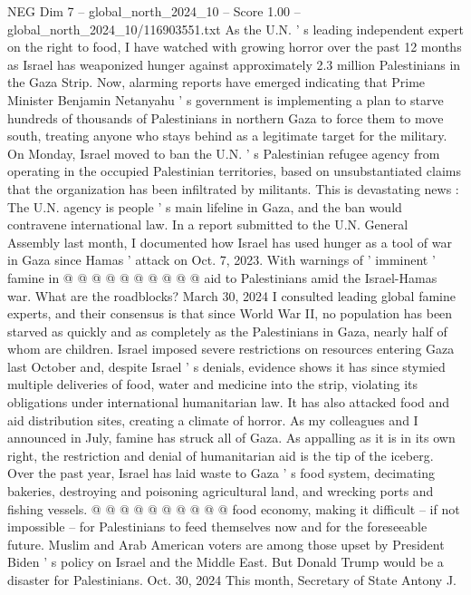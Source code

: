 \begin{textsample}{NEG Dim 7 – global\_north\_2024\_10 – Score 1.00 – global\_north\_2024\_10/116903551.txt}  \label{ex:f7_neg_365}
As the U.N. ' s leading independent expert on the right to food, I have watched with growing horror over the past 12 months as Israel has weaponized hunger against approximately 2.3 million Palestinians in the Gaza Strip.
Now, alarming reports have emerged indicating that Prime Minister Benjamin Netanyahu ' s government is implementing a plan to starve hundreds of thousands of Palestinians in northern Gaza to force them to move south, treating anyone who stays behind as a legitimate target for the military.
On Monday, Israel moved to ban the U.N. ' s Palestinian refugee agency from operating in the occupied Palestinian territories, based on unsubstantiated claims that the organization has been infiltrated by militants.
This is devastating news : The U.N. agency is people ' s main lifeline in Gaza, and the ban would contravene international law.
In a report submitted to the U.N.
General Assembly last month, I documented how Israel has used hunger as a tool of war in Gaza since Hamas ' attack on Oct. 7, 2023.
With warnings of ' imminent ' famine in @ @ @ @ @ @ @ @ @ @ aid to Palestinians amid the Israel-Hamas war.
What are the roadblocks?
March 30, 2024 I consulted leading global famine experts, and their consensus is that since World War II, no population has been starved as quickly and as completely as the Palestinians in Gaza, nearly half of whom are children.
Israel imposed severe restrictions on resources entering Gaza last October and, despite Israel ' s denials, evidence shows it has since stymied multiple deliveries of food, water and medicine into the strip, violating its obligations under international humanitarian law.
It has also attacked food and aid distribution sites, creating a climate of horror.
As my colleagues and I announced in July, famine has struck all of Gaza.
As appalling as it is in its own right, the restriction and denial of humanitarian aid is the tip of the iceberg.
Over the past year, Israel has laid waste to Gaza ' s food system, decimating bakeries, destroying and poisoning agricultural land, and wrecking ports and fishing vessels. @ @ @ @ @ @ @ @ @ @ food economy, making it difficult -- if not impossible -- for Palestinians to feed themselves now and for the foreseeable future.
Muslim and Arab American voters are among those upset by President Biden ' s policy on Israel and the Middle East.
But Donald Trump would be a disaster for Palestinians.
Oct. 30, 2024 This month, Secretary of State Antony J.

\end{textsample}
